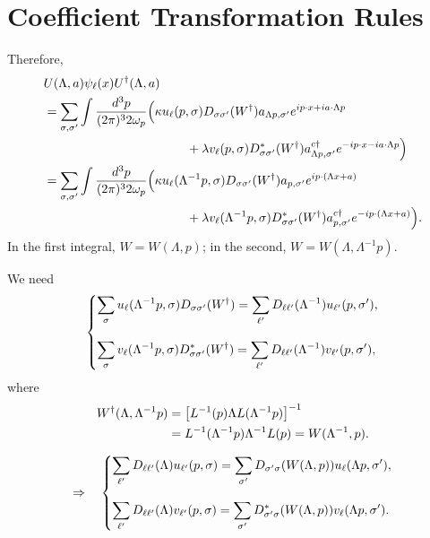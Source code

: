 \section{Coefficient Transformation Rules}
Therefore,
\begin{align}
    & U(\Lambda, a) \psi_\ell(x) U^\dagger(\Lambda, a) \notag \\
    & = \sum_{\sigma, \sigma'} \int \frac{d^3 p}{(2 \pi)^3 2 \omega_p} \Bigl(\kappa u_\ell(p, \sigma) D_{\sigma \sigma'} (W^\dagger) a_{\Lambda p, \sigma'} e^{i p \cdot x + i a \cdot \Lambda p} \notag \\
    & \hspace{40mm} + \lambda v_\ell(p, \sigma) D^*_{\sigma \sigma'} (W^\dagger) a^{c \dagger}_{\Lambda p, \sigma'} e^{ - i p \cdot x - i a \cdot \Lambda p} \Bigr) \notag \\
    & = \sum_{\sigma, \sigma'} \int \frac{d^3 p}{(2 \pi)^3 2 \omega_p} \Bigl(\kappa u_\ell(\Lambda^{ - 1} p, \sigma) D_{\sigma \sigma'} (W^\dagger) a_{p, \sigma'} e^{i p \cdot (\Lambda x + a)} \notag \\
    & \hspace{40mm} + \lambda v_\ell(\Lambda^{ - 1} p, \sigma) D^*_{\sigma \sigma'} (W^\dagger) a^{c \dagger}_{p, \sigma'} e^{ - i p \cdot (\Lambda x + a)} \Bigr).
\end{align}
In the first integral, $W = W(\Lambda, p)$; in the second, $W = W(\Lambda, \Lambda^{ - 1} p)$.
\begin{framed}
    We need
    \begin{equation}
        \begin{dcases}
            \displaystyle \sum_\sigma u_\ell(\Lambda^{ - 1} p, \sigma) D_{\sigma \sigma'} (W^\dagger) = \sum_{\ell'} D_{\ell \ell'} (\Lambda^{ - 1}) u_{\ell'} (p, \sigma'), \\[3mm]
            \displaystyle \sum_\sigma v_\ell(\Lambda^{ - 1} p, \sigma) D^*_{\sigma \sigma'} (W^\dagger) = \sum_{\ell'} D_{\ell \ell'} (\Lambda^{ - 1}) v_{\ell'} (p, \sigma'),
        \end{dcases}
    \end{equation}
    where
    \begin{align}
        W^\dagger(\Lambda, \Lambda^{ - 1} p) & = \bigl[L^{ - 1} (p) \Lambda L(\Lambda^{ - 1} p) \bigr]^{ - 1} \notag \\
        & = L^{ - 1} (\Lambda^{ - 1} p) \Lambda^{ - 1} L(p) = W(\Lambda^{ - 1}, p).
    \end{align}
\end{framed}
\begin{equation}
    \Rightarrow \quad
    \begin{dcases}
        \displaystyle \sum_{\ell'} D_{\ell \ell'} (\Lambda) u_{\ell'} (p, \sigma) = \sum_{\sigma'} D_{\sigma' \sigma} (W(\Lambda, p)) u_\ell(\Lambda p, \sigma'), \\[3mm]
        \displaystyle \sum_{\ell'} D_{\ell \ell'} (\Lambda) v_{\ell'} (p, \sigma) = \sum_{\sigma'} D^*_{\sigma' \sigma} (W(\Lambda, p)) v_\ell(\Lambda p, \sigma').
    \end{dcases}
\end{equation}
